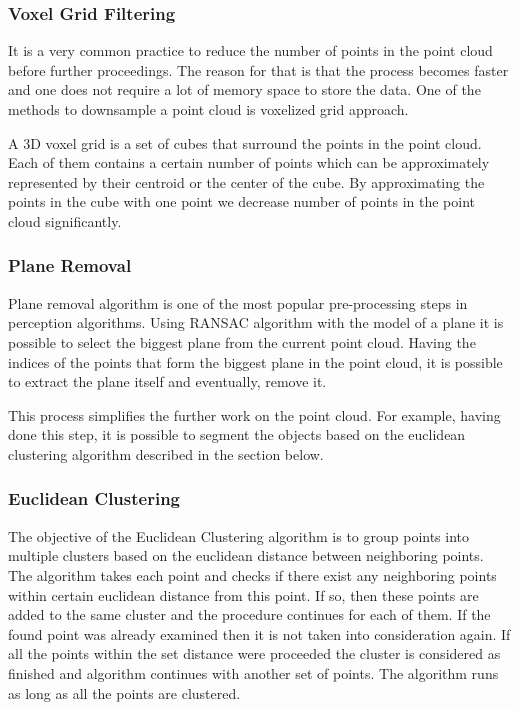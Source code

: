 \subsubsection{Voxel Grid Filtering}
It is a very common practice to reduce the number of points in the point cloud before further proceedings. The reason for that is that the process becomes faster and one does not require a lot of memory space to store the data. One of the methods to downsample a point cloud is voxelized grid approach.

A 3D voxel grid is a set of cubes that surround the points in the point cloud. Each of them contains a certain number of points which can be approximately represented by their centroid or the center of the cube. By approximating the points in the cube with one point we decrease number of points in the point cloud significantly. 

\subsubsection{Plane Removal}
Plane removal algorithm is one of the most popular pre-processing steps in perception algorithms. Using RANSAC algorithm with the model of a plane it is possible to select the biggest plane from the current point cloud. Having the indices of the points that form the biggest plane in the point cloud, it is possible to extract the plane itself and eventually, remove it. 

This process simplifies the further work on the point cloud. For example, having done this step, it is possible to segment the objects based on the euclidean clustering algorithm described in the section below.


\subsubsection{Euclidean Clustering}
The objective of the Euclidean Clustering algorithm is to group points into multiple clusters based on the euclidean distance between neighboring points. The algorithm takes each point and checks if there exist any neighboring points within certain euclidean distance from this point. If so, then these points are added to the same cluster and the procedure continues for each of them. If the found point was already examined then it is not taken into consideration again. If all the points within the set distance were proceeded the cluster is considered as finished and algorithm continues with another set of points. The algorithm runs as long as all the points are clustered. 

